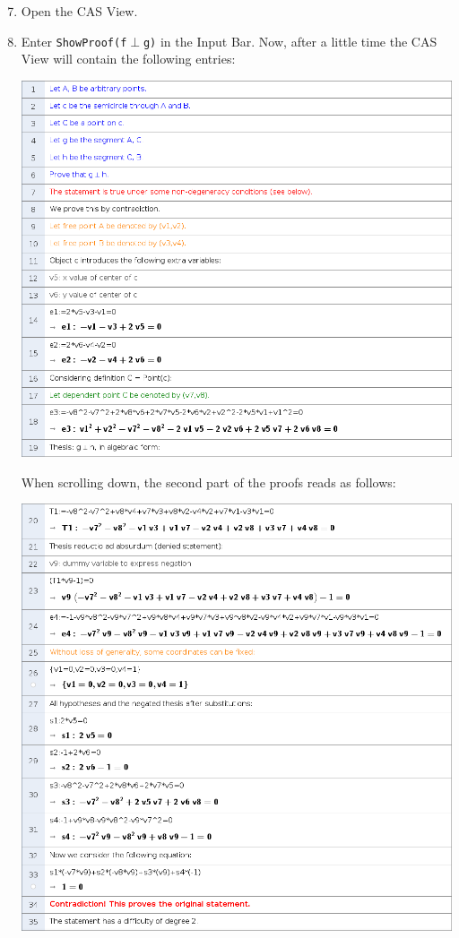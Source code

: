 \documentclass{article}
\begin{document}
\begin{enumerate}
\setcounter{enumi}{6}
    \item Open the CAS View.
    \item Enter \texttt{ShowProof(f$\perp$g)} in the Input Bar. Now, after a little time the CAS View will contain the following entries:
    \begin{center}
    \includegraphics[scale=0.5]{ShowProof-example-1}
    \end{center}
    When scrolling down, the second part of the proofs reads as follows:
    \begin{center}
    \includegraphics[scale=0.5]{ShowProof-example-2}

\end{center}
\end{enumerate}
\end{document}

